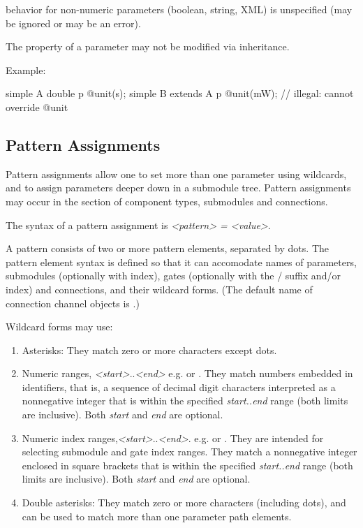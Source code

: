  behavior for non-numeric parameters (boolean, string, XML)
is unspecified (may be ignored or may be an error).

The  property of a parameter may not be modified via inheritance.

Example:
\begin{ned}
simple A {
    double p @unit(s);
}
simple B extends A {
    p @unit(mW);  // illegal: cannot override @unit
}
\end{ned}



\subsection{Pattern Assignments}
\label{sec:ned-ref:pattern-assignments}

Pattern assignments allow one to set more than one parameter using
wildcards, and to assign parameters deeper down in a submodule tree.
Pattern assignments may occur in the 
section of component types, submodules and connections.

The syntax of a pattern assignment is \textit{<pattern> = <value>}.

A pattern consists of two or more pattern elements, separated by dots.
The pattern element syntax is defined so that it can accomodate names of
parameters, submodules (optionally with index), gates (optionally with the
/ suffix and/or index) and connections, and their
wildcard forms. (The default name of connection channel objects is
.)

Wildcard forms may use:
\begin{enumerate}
  \item Asterisks: They match zero or more characters except dots.
  \item Numeric ranges, \ttt{\{}\textit{<start>}..\textit{<end>}\ttt{\}}
    e.g.  or . They match numbers embedded
    in identifiers, that is, a sequence of decimal digit characters interpreted as a
    nonnegative integer that is within the specified \textit{start..end}
    range (both limits are inclusive). Both \textit{start} and \textit{end}
    are optional.
  \item Numeric index ranges,\ttt{[}\textit{<start>}..\textit{<end>}\ttt{]}.
    e.g. \ttt{[5..120]} or \ttt{[..10]}. They are intended for selecting
    submodule and gate index ranges. They match a nonnegative integer
    enclosed in square brackets that is within the specified
    \textit{start..end} range (both limits are inclusive).
    Both \textit{start} and \textit{end} are optional.
  \item Double asterisks: They match zero or more characters (including dots),
    and can be used to match more than one parameter path elements.
\end{enumerate}

